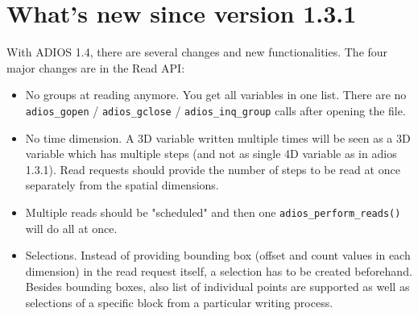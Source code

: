 %
%
%
%
%

\section {What's new since version 1.3.1}

With ADIOS 1.4, there are several changes and new functionalities. 
The four major changes are in the Read API:

\begin{itemize}
\item No groups at reading anymore. You get all variables in one list.
There are no \verb+adios_gopen+ / \verb+adios_gclose+ / \verb+adios_inq_group+ 
calls after opening the file.
\item No time dimension. A 3D variable written multiple times will be seen as 
a 3D variable which has multiple steps (and not as single 4D variable as in adios 1.3.1).
Read requests should provide the number of steps to be read at once separately from the
spatial dimensions.
\item Multiple reads should be "scheduled" and then one \verb+adios_perform_reads()+ 
will do all at once. 
\item Selections. Instead of providing bounding box (offset and count values
in each dimension) in the read request itself, a selection has to be created 
beforehand. Besides bounding boxes, also list of individual points are supported 
as well as selections of a specific block from a particular writing process.
\end{itemize}

